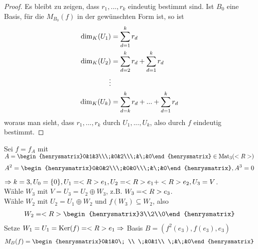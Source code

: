 \begin{proof}
	Es bleibt zu zeigen, dass $r_1,...,r_k$ eindeutig bestimmt sind. Ist $B_0$ eine Basis, für die $M_{B_0}(f)$ in der gewünschten Form ist, so ist 
	\begin{align}
		\dim_K(U_1) &= \sum\limits_{d=1}^k r_d \notag \\
		\dim_K(U_2) &= \sum\limits_{d=2}^k r_d + \sum\limits_{d=1}^k r_d \notag \\
		\vdots \notag \\
		\dim_K(U_k) &= \sum\limits_{d=k}^k r_d + ... + \sum\limits_{d=1}^k r_d\notag 
	\end{align}
	woraus man sieht, dass $r_1,...,r_k$ durch $U_1,...,U_k$, also durch $f$ eindeutig bestimmt.
\end{proof}

\begin{example}
	Sei $f=f_A$ mit $A=\begin{henrysmatrix}0&1&3\\\;&0&2\\\;&\;&0\end{henrysmatrix}\in\Mat_3(\real)$
	\begin{align}
		A^2=\begin{henrysmatrix}0&0&2\\\;&0&0\\\;&\;&0\end{henrysmatrix}, A^3=0\notag
	\end{align}
	$\Rightarrow k=3, U_0=\{0\}, U_1=<R> e_1, U_2=<R> e_1+<R> e_2, U_3=V$. \\
	Wähle $W_3$ mit $V=U_3=U_2\oplus W_3$, z.B. $W_3=<R> e_3$. \\
	Wähle $W_2$ mit $U_2=U_1\oplus W_2$ und $f(W_3)\subseteq W_2$, also 
	\begin{align}
		W_2=\real\begin{henrysmatrix}3\\2\\0\end{henrysmatrix}\notag
	\end{align}
	Setze $W_1=U_1=\operatorname{Ker}(f)=<R> e_1\Rightarrow$ Basis $B=(f^2(e_3),f(e_3),e_3)$
	\begin{align}
		M_B(f)=\begin{henrysmatrix}0&1&0\; \\ \;&0&1\\ \;&\;&0\end{henrysmatrix}\notag
	\end{align}
\end{example}